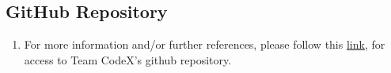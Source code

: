 \subsection {GitHub Repository}
	\begin{enumerate}
		\item[] For more information and/or further references, please follow this \href{https://github.com/ish1993/eVoting}{link}, for access to Team CodeX's github repository.
	\end{enumerate}